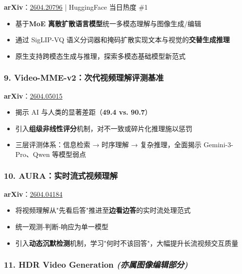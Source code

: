 \textbf{arXiv}：\href{https://arxiv.org/abs/2604.20796}{2604.20796} | HuggingFace 当日热度 \#1

\begin{itemize}[leftmargin=1.5em]
  \item 基于\textbf{MoE 离散扩散语言模型}统一多模态理解与图像生成/编辑
  \item 通过 SigLIP-VQ 语义分词器和掩码扩散实现文本与视觉的\textbf{交替生成推理}
  \item 原生支持跨模态生成与推理，探索多模态基础模型新范式
\end{itemize}

\subsubsection{9. Video-MME-v2：次代视频理解评测基准}

\textbf{arXiv}：\href{https://arxiv.org/abs/2604.05015}{2604.05015}

\begin{itemize}[leftmargin=1.5em]
  \item 揭示 AI 与人类的显著差距（\textbf{49.4 vs. 90.7}）
  \item 引入\textbf{组级非线性评分}机制，对不一致或碎片化推理施以惩罚
  \item 三层评测体系：信息检索 → 时序理解 → 复杂推理，全面揭示 Gemini-3-Pro、Qwen 等模型弱点
\end{itemize}

\subsubsection{10. AURA：实时流式视频理解}

\textbf{arXiv}：\href{https://arxiv.org/abs/2604.04184}{2604.04184}

\begin{itemize}[leftmargin=1.5em]
  \item 将视频理解从"先看后答"推进至\textbf{边看边答}的实时流处理范式
  \item 统一观测-判断-响应为单一模型
  \item 引入\textbf{动态沉默检测}机制，学习"何时不该回答"，大幅提升长流视频交互质量
\end{itemize}

\subsubsection{11. HDR Video Generation \textit{(亦属图像编辑部分)}}

